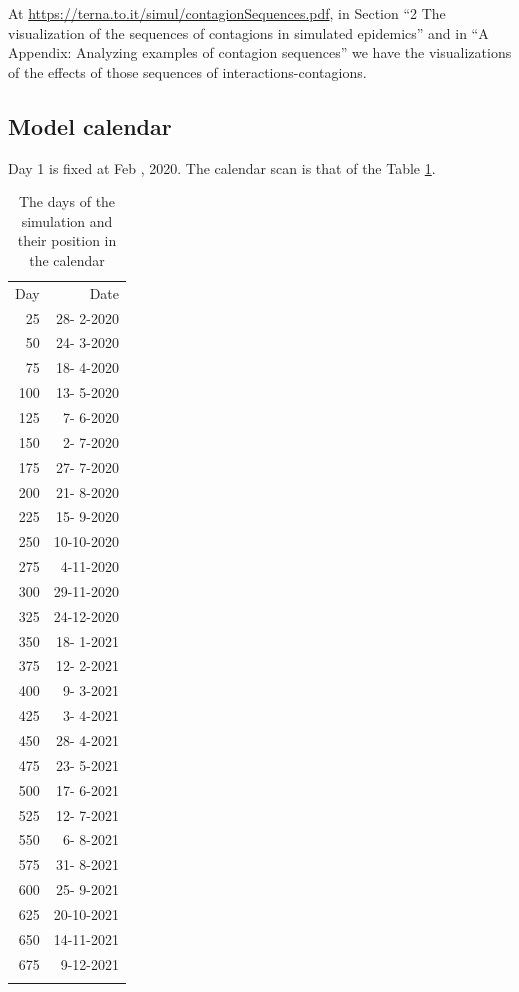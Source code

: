 \documentclass[graybox]{svmult}
\begin{document}
At \url{https://terna.to.it/simul/contagionSequences.pdf}, in Section ``2 The visualization of the sequences of contagions in simulated epidemics'' and in ``A Appendix: Analyzing examples of contagion sequences'' we have the visualizations of the effects of those sequences of interactions-contagions.


\subsection{Model calendar}\label{calend}

Day 1 is fixed at Feb , 2020. The calendar scan is that of the Table \ref{dates}.

\begin{table}[t]
\begin{footnotesize}
\begin{tabular}{rr}
\hline\noalign{\smallskip}
 Day & Date  \\
 \noalign{\smallskip}\svhline\noalign{\smallskip}25 & 28- 2-2020 \\
 50 & 24- 3-2020 \\
 75 & 18- 4-2020 \\
100 & 13- 5-2020 \\
125 &  7- 6-2020 \\
150 &  2- 7-2020 \\
175 & 27- 7-2020 \\
200 & 21- 8-2020 \\
225 & 15- 9-2020 \\
250 & 10-10-2020 \\
275 &  4-11-2020 \\
300 & 29-11-2020 \\
325 & 24-12-2020 \\
350 & 18- 1-2021 \\
375 & 12- 2-2021 \\
400 &  9- 3-2021 \\
425 &  3- 4-2021 \\
450 & 28- 4-2021 \\
475 & 23- 5-2021 \\
500 & 17- 6-2021 \\
525 & 12- 7-2021 \\
550 &  6- 8-2021 \\
575 & 31- 8-2021 \\
600 & 25- 9-2021 \\
625 & 20-10-2021 \\
650 & 14-11-2021 \\
675 &  9-12-2021 \\
\hline\noalign{\smallskip}
\end{tabular}
\end{footnotesize}
\caption{The days of the simulation and their position in the calendar}
\label{dates}
\end{table}
\end{document}
